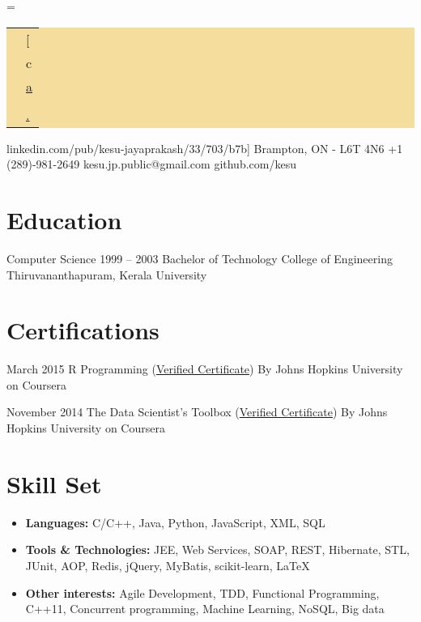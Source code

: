\documentclass{tccv}
\renewcommand\personal[5][]{%
    \needspace{0.5\textheight}%
    \newdimen\boxwidth%
    \boxwidth=\dimexpr\linewidth-2\fboxsep\relax%
    \colorbox[HTML]{F5DD9D}{%
    \begin{tabularx}{\boxwidth}{c|X}
    \Writinghand & {#2}\smallskip\\
    \Telefon     & {#3}\smallskip\\
    \Letter      & \href{mailto:#4}{#4}
    \ifstrempty{#1}{}{\smallskip\\ \Lightning & \href{http://#1}{#1}}
    \ifstrempty{#5}{}{\smallskip\\ \Lightning & \href{http://#5}{#5}}
    \end{tabularx}}}
\begin{document}
\personal
    [ca.linkedin.com/pub/kesu-jayaprakash/33/703/b7b]
    {Brampton, ON - L6T 4N6}
    {+1 (289)-981-2649}
    {kesu.jp.public@gmail.com}
    {github.com/kesu}

\section{Education}

\begin{yearlist}

\item[Computer Science]{1999 -- 2003}
     {Bachelor of Technology}
     {College of Engineering Thiruvananthapuram, Kerala University}
\end{yearlist}

\section{Certifications}

\begin{yearlist}

\item{March 2015}
     {R Programming (\href{https://www.coursera.org/account/accomplishments/certificate/ZNR9NY3SSH}{Verified Certificate})}
     {By Johns Hopkins University on Coursera}

\item{November 2014}
     {The Data Scientist's Toolbox (\href{https://www.coursera.org/account/accomplishments/certificate/745X8Z7SQJ}{Verified Certificate})}
     {By Johns Hopkins University on Coursera}

\end{yearlist}


\section{Skill Set}
{\begin{itemize}
\item
    {\textbf{Languages:} C/C++, Java, Python, JavaScript, XML, SQL}
\item
    {\textbf{Tools \& Technologies:} JEE, Web Services, SOAP, REST, Hibernate, STL, JUnit, AOP, Redis, jQuery, MyBatis, scikit-learn, \LaTeX}
\item
    {\textbf{Other interests:} Agile Development, TDD, Functional Programming, C++11, Concurrent programming, Machine Learning, NoSQL, Big data}
\end{itemize}}
\end{document}
